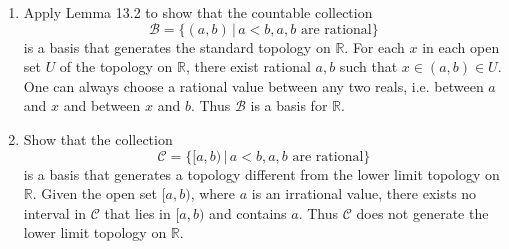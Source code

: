 \documentclass[12pt,letterpaper]{article}
\newcommand{\n}{\break}
\begin{document}
\begin{enumerate}
\begin{enumerate}
  \item Apply Lemma 13.2 to show that the countable collection $$\mathcal{B}=\{(a,b)\,|\, a<b, a,b \text{ are rational}\}$$ is a basis that generates the standard topology on $\mathbb{R}$.\n
    \indent For each $x$ in each open set $U$ of the topology on $\mathbb{R}$, there exist rational $a,b$ such that $x\in (a,b)\in U$. One can always choose a rational value between any two reals, i.e. between $a$ and $x$ and between $x$ and $b$. Thus $\mathcal{B}$ is a basis for $\mathbb{R}$.
  \item Show that the collection $$\mathcal{C}=\{[a,b)\,|\, a<b, a,b \text{ are rational}\}$$ is a basis that generates a topology different from the lower limit topology on $\mathbb{R}$. \n
    \indent Given the open set $[a,b)$, where $a$ is an irrational value, there exists no interval in $\mathcal{C}$ that lies in $[a,b)$ and contains $a$. Thus $\mathcal{C}$ does not generate the lower limit topology on $\mathbb{R}$.
  \end{enumerate}
\end{enumerate}
\end{document}
